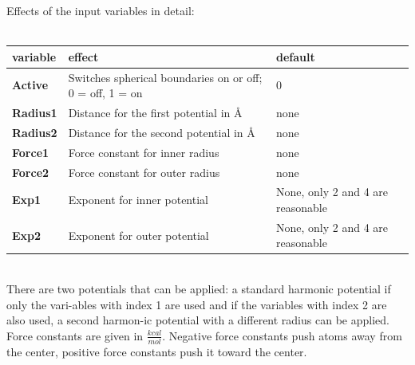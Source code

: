 \documentclass[10pt,a4paper]{article} %
\begin{document}
{	Effects of the input variables in detail:\\~\\
	\begin{tabularx}{\textwidth}{l|X|X}
		\textbf{variable} & effect & default \\
		\hline
		\textbf{Active} & Switches spherical boundaries on or off; 0 = off, 1 = on & 0 \\
		\textbf{Radius1} & Distance for the first potential in Å & none \\
		\textbf{Radius2} & Distance for the second potential in Å & none \\
		\textbf{Force1} & Force constant for inner radius & none \\
		\textbf{Force2} & Force constant for outer radius & none \\
		\textbf{Exp1} & Exponent for inner potential & None, only 2 and 4 are reasonable \\
		\textbf{Exp2} & Exponent for outer potential & None, only 2 and 4 are reasonable \\
	\end{tabularx}~\\
	There are two potentials that can be applied: a standard harmonic potential if only the vari-ables with index 1 are used and if the variables with index 2 are also used, a second harmon-ic potential with a different radius can be applied.
	Force constants are given in $\frac{kcal}{mol}$. Negative force constants push atoms away from the center, positive force constants push it toward the center.

}
\end{document}
